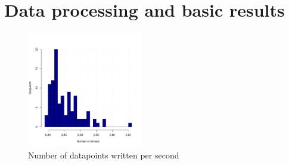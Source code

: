 \section{Data processing and basic results}
\label{section:results}


\begin{figure}[!hbt]\centering
  \includegraphics[width=0.45\textwidth]{graphics/1tag.dist.write.pdf}
  \caption{Number of datapoints written per second}
  \label{fig:write:1tag}
\end{figure}

